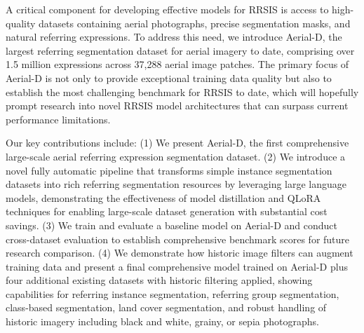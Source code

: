 A critical component for developing effective models for RRSIS is access to high-quality datasets containing aerial photographs, precise segmentation masks, and natural referring expressions. To address this need, we introduce Aerial-D, the largest referring segmentation dataset for aerial imagery to date, comprising over 1.5 million expressions across 37,288 aerial image patches. The primary focus of Aerial-D is not only to provide exceptional training data quality but also to establish the most challenging benchmark for RRSIS to date, which will hopefully prompt research into novel RRSIS model architectures that can surpass current performance limitations.

Our key contributions include: (1) We present Aerial-D, the first comprehensive large-scale aerial referring expression segmentation dataset. (2) We introduce a novel fully automatic pipeline that transforms simple instance segmentation datasets into rich referring segmentation resources by leveraging large language models, demonstrating the effectiveness of model distillation and QLoRA techniques for enabling large-scale dataset generation with substantial cost savings. (3) We train and evaluate a baseline model on Aerial-D and conduct cross-dataset evaluation to establish comprehensive benchmark scores for future research comparison. (4) We demonstrate how historic image filters can augment training data and present a final comprehensive model trained on Aerial-D plus four additional existing datasets with historic filtering applied, showing capabilities for referring instance segmentation, referring group segmentation, class-based segmentation, land cover segmentation, and robust handling of historic imagery including black and white, grainy, or sepia photographs.

